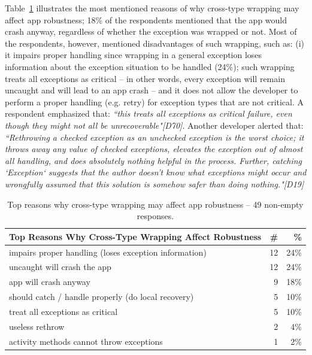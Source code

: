  Table~\ref{tab:robustness} illustrates the  most mentioned reasons of why cross-type wrapping may affect app robustness; 18\% of the respondents mentioned that the app would crash anyway, regardless of whether the exception was wrapped or not. Most of the respondents, however, mentioned disadvantages of such wrapping, such as: (i) it impairs proper handling since wrapping in a general exception loses information about the exception situation to be handled (24\%); such wrapping treats all exceptions as critical -- in other words, every exception will remain uncaught and will lead to an app crash -- and it does not allow the developer to perform a proper handling (e.g. retry) for exception types that are not critical. A respondent emphasized that: \emph{``this treats all exceptions as critical failure, even though they might not all be unrecoverable"[D70]}. Another developer alerted that: \emph{``Rethrowing a checked exception as an unchecked exception is the worst choice; it throws away any value of checked exceptions, elevates the exception out of almost all handling, and does absolutely nothing helpful in the process. Further, catching `Exception` suggests that the author doesn't know what exceptions might occur and wrongfully assumed that this solution is somehow safer than doing nothing."[D19]}

\bigskip


\begin{table}
\scriptsize
\centering
\begin{tabular}{lrr}
\hline
\bfseries{Top Reasons Why Cross-Type Wrapping Affect Robustness} & \bfseries{\#} & \bfseries{\%} \\
\hline
impairs proper handling (loses exception information)	& 12 &	24\% \\
uncaught will crash the app	& 12 &	24\% \\
app will crash anyway	& 9	& 18\% \\
should catch / handle properly (do local recovery)	 & 5 & 	10\% \\
treat all exceptions as critical	& 5 &	10\% \\
useless rethrow	& 2 &	4\% \\
activity methods cannot throw exceptions &	1 &	2\% \\

\hline
\end{tabular}
\caption{Top reasons why cross-type wrapping may affect app robustness -- 49 non-empty responses. }
\label{tab:robustness}
\end{table}

